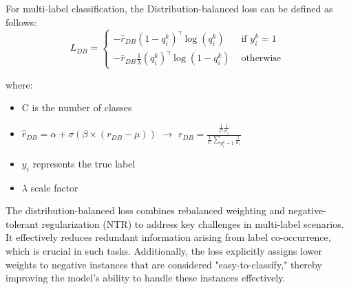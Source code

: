 For multi-label classification, the Distribution-balanced loss can be defined as follows:
\begin{equation}
L_{D B}= \begin{cases}-\hat{r}_{D B}\left(1-q_i^k\right)^\gamma \log \left(q_i^k\right) & \text { if } y_i^k=1 \\ -\hat{r}_{D B} \frac{1}{\lambda}\left(q_i^k\right)^\gamma \log \left(1-q_i^k\right) & \text { otherwise }\end{cases}
\end{equation}

where:
\begin{itemize}
\item{C is the number of classes}
\item $\hat{r}_{D B}=\alpha+\sigma\left(\beta \times\left(r_{D B}-\mu\right)\right)$ $\rightarrow$ $r_{D B}= \frac{\frac{1}{C} \frac{1}{n_i}} {\frac{1}{C} \sum_{y_i^k=1} \frac{1}{n_i}}$
\item{\(y_{i}\) represents the true label }
\item {$\lambda$ scale factor}
\end{itemize}

The distribution-balanced loss combines rebalanced weighting and negative-tolerant regularization (NTR) to address key challenges in multi-label scenarios. It effectively reduces redundant information arising from label co-occurrence, which is crucial in such tasks. Additionally, the loss explicitly assigns lower weights to negative instances that are considered "easy-to-classify," thereby improving the model's ability to handle these instances effectively. \cite{wu2020distribution}







